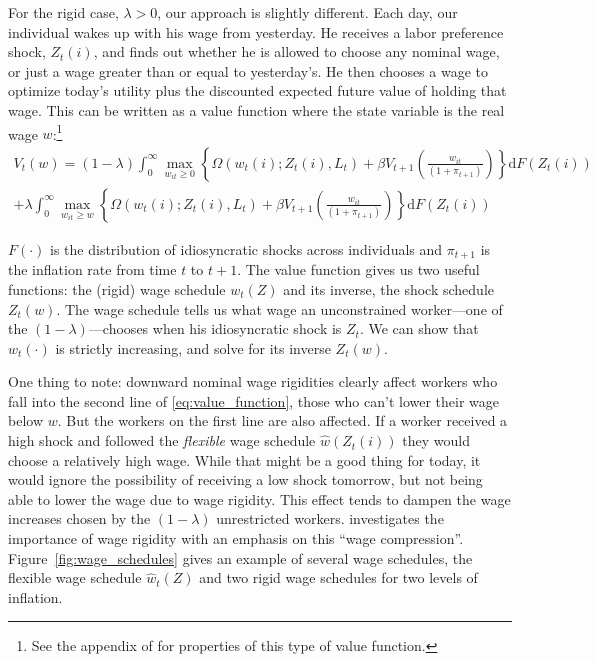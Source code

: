 \documentclass[12pt,a4paper]{scrartcl}            %
\begin{document}
For the rigid case, $\lambda > 0$, our approach is slightly different.
Each day, our individual wakes up with his wage from yesterday.
He receives a labor preference shock, $Z_t(i)$, and finds out whether he is allowed to choose any nominal wage, or just a wage greater than or equal to yesterday's.
He then chooses a wage to optimize today's utility plus the discounted expected future value of holding that wage.
This can be written as a value function where the state variable is the real wage $w$:\footnote{
    See the appendix of \cite{daly_hobijn_2013} for properties of this type of value function.
}
\begin{multline}
    \label{eq:value_function}
    V_t(w) = (1 - \lambda) \int_{0}^{\infty} \max_{w_{it} \geq 0} \left\{ \Omega( w_t(i); Z_t(i), L_t ) + \beta V_{t+1}\left( \frac{w_{it}}{(1 + \pi_{t+1})} \right) \right\} \mathrm{d}F(Z_t(i)) \\
                + \lambda  \int_{0}^{\infty} \max_{w_{it} \geq w} \left\{ \Omega( w_t(i); Z_t(i), L_t ) + \beta V_{t+1}\left( \frac{w_{it}}{(1 + \pi_{t+1})} \right) \right\} \mathrm{d}F(Z_t(i))
\end{multline}

$F(\cdot)$ is the distribution of idiosyncratic shocks across individuals and $\pi_{t+1}$ is the inflation rate from time $t$ to $t+1$.
The value function gives us two useful functions: the (rigid) wage schedule $w_t(Z)$ and its inverse, the shock schedule $Z_t(w)$.
The wage schedule tells us what wage an unconstrained worker---one of the $(1 - \lambda)$---chooses when his idiosyncratic shock is $Z_t$.
We can show that $w_t(\cdot)$ is strictly increasing, and solve for its inverse $Z_t(w)$.

One thing to note: downward nominal wage rigidities clearly affect workers who fall into the second line of \eqref{eq:value_function}, those who can't lower their wage below $w$.
But the workers on the first line are also affected.
If a worker received a high shock and followed the \emph{flexible} wage schedule $\hat{w}(Z_t(i))$ they would choose a relatively high wage.
While that might be a good thing for today, it would ignore the possibility of receiving a low shock tomorrow, but not being able to lower the wage due to wage rigidity.
This effect tends to dampen the wage increases chosen by the $(1 - \lambda)$ unrestricted workers.
\cite{elsby_2009} investigates the importance of wage rigidity with an emphasis on this ``wage compression''.
Figure~\ref{fig:wage_schedules} gives an example of several wage schedules, the flexible wage schedule $\hat{w}_t(Z)$ and two rigid wage schedules for two levels of inflation.
\end{document}
